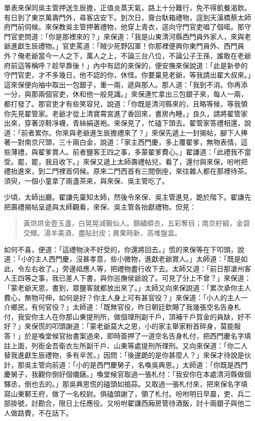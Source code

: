 單表來保同吳主管押送生辰擔，正值炎蒸天氣，路上十分難行，免不得飢餐渴飲。有日到了東京萬壽門外，尋客店安下。到次日，齎台馱箱禮物，逕到天漢橋蔡太師府門前伺候。來保教吳主管押著禮物，他穿上青衣，逕向守門官吏唱了個喏。那守門官吏問道：「你是那裡來的？」來保道：「我是山東清河縣西門員外家人，來與老爺進獻生辰禮物。」官吏罵道：「賊少死野囚軍！你那裡便興你東門員外、西門員外？俺老爺當今一人之下，萬人之上，不論三台八位，不論公子王孫，誰敢在老爺府前這等稱呼？趁早靠後！」內中有認的來保的，便安撫來保說道：「此是新參的守門官吏，才不多幾日，他不認的你，休怪。你要稟見老爺，等我請出翟大叔來。」這來保便向袖中取出一包銀子，重一兩，遞與那人。那人道：「我到不消。你再添一分，與那兩個官吏，休和他一般見識。」來保連忙拿出三包銀子來，每人一兩，都打發了。那官吏才有些笑容兒，說道：「你既是清河縣來的，且略等候，等我領你先見翟管家。老爺才從上清寶霄宮進了香回來，書房內睡。」良久，請將翟管家出來，穿著涼鞋凈襪，青絲絹道袍。來保見了，忙磕下頭去。翟管家答禮相還，說道：「前者累你。你來與老爺進生辰擔禮來了？」來保先遞上一封揭帖，腳下人捧著一對南京尺頭，三十兩白金，說道：「家主西門慶，多上覆翟爹，無物表情，這些薄禮，與翟爹賞人。前者鹽客王四之事，多蒙翟爹費心。」翟謙道：「此禮我不當受。罷，罷，我且收下。」來保又遞上太師壽禮帖兒，看了，還付與來保，吩咐把禮抬進來，到二門裡首伺候。原來二門西首有三間倒座，來往雜人都在那裡待茶。須臾，一個小童拿了兩盞茶來，與來保、吳主管吃了。

少頃，太師出廳。翟謙先稟知太師，然後令來保、吳主管進見，跪於階下。翟謙先把壽禮揭帖呈遞與太師觀看，來保、吳主管各抬獻禮物。但見：
\begin{quote}
黃烘烘金壺玉盞，白晃晃減靸仙人。錦繡蟒衣，五彩奪目；南京紵緞，金碧交輝。湯羊美酒，盡貼封皮；異果時新，高堆盤盒。
\end{quote}
如何不喜，便道：「這禮物決不好受的，你還將回去。」慌的來保等在下叩頭，說道：「小的主人西門慶，沒甚孝意，些小微物，進獻老爺賞人。」太師道：「既是如此，令左右收了。」旁邊祗應人等，把禮物盡行收下去。太師又道：「前日那滄州客人王四等之事，我已差人下書，與你巡撫侯爺說了。可見了分上不曾？」來保道：「蒙老爺天恩，書到，眾鹽客就都放出來了。」太師又向來保說道：「累次承你主人費心，無物可伸，如何是好？你主人身上可有甚官役？」來保道：「小人的主人一介鄉民，有何官役？」太師道：「既無官役，昨日朝廷欽賜了我幾張空名告身札付，我安你主人在你那山東提刑所，做個理刑副千戶，頂補千戶賀金的員缺，好不好？」來保慌的叩頭謝道：「蒙老爺莫大之恩，小的家主舉家粉首碎身，莫能報答！」於是喚堂候官抬書案過來，即時簽押了一道空名告身札付，把西門慶名字填註上面，列銜金吾衛衣左所副千戶、山東等處提刑所理刑。又向來保道：「你二人替我進獻生辰禮物，多有辛苦。」因問：「後邊跪的是你甚麼人？」來保才待說是伙計，那吳主管向前道：「小的是西門慶舅子，名喚吳典恩。」太師道：「你既是西門慶舅子，我觀你倒好個儀錶。」喚堂候官取過一張札付：「我安你在本處清河縣做個驛丞，倒也去的。」那吳典恩慌的磕頭如搗蒜。又取過一張札付來，把來保名字填寫山東鄆王府，做了一名校尉。俱磕頭謝了，領了札付。吩咐明日早晨，吏、兵二部掛號，討勘合，限日上任應役。又吩咐翟謙西廂房管待酒飯，討十兩銀子與他二人做路費，不在話下。

